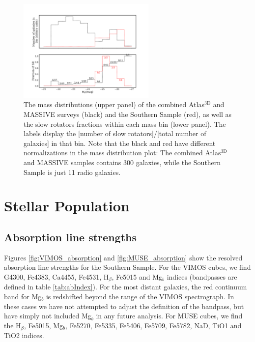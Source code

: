 		

		\begin{figure}
			\centering
			\includegraphics[width=0.6\textwidth]{chapter4/M_k_binned.png}
			\caption[Mass matching global kinematics]{The mass distributions (upper panel) of the combined Atlas$^\text{3D}$ and MASSIVE surveys (black) and the Southern Sample (red), as well as the slow rotators fractions within each mass bin (lower panel). The labels display the [number of slow rotators]/[total number of galaxies] in that bin. Note that the black and red have different normalizations in the mass distribution plot: The combined Atlas$^\text{3D}$ and MASSIVE samples contains 300 galaxies, while the Southern Sample is just 11 radio galaxies.}
			\label{fig:SRmassFraction}
		\end{figure}


		


 


\section{Stellar Population}
	\label{sec:pop}

	\subsection{Absorption line strengths}
		\label{subsec:absorption}
		Figures \ref{fig:VIMOS_absorption} and \ref{fig:MUSE_absorption} show the resolved absorption line strengths for the Southern Sample. For the VIMOS cubes, we find G4300, Fe4383, Ca4455, Fe4531, H$_\beta$, Fe5015 and Mg$_b$ indices (bandpasses are defined in table \ref{tab:abIndex}). For the most distant galaxies, the red continuum band for Mg$_b$ is redshifted beyond the range of the VIMOS spectrograph. In these cases we have not attempted to adjust the definition of the bandpass, but have simply not included Mg$_b$ in any future analysis. For MUSE cubes, we find the H$_\beta$, Fe5015, Mg$_b$, Fe5270, Fe5335, Fe5406, Fe5709, Fe5782, NaD, TiO1 and TiO2 indices. 

